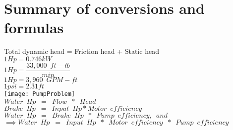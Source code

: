 \section{Summary of conversions and formulas}

Total dynamic head = Friction head + Static head\\
\vspace{0.3cm}
$1Hp=0.746kW$\\
\vspace{0.3cm}
$1Hp=\dfrac{33,000 \enspace ft-lb}{min}$\\
\vspace{0.3cm}
$1Hp=3,960 \enspace GPM-ft$\\
\vspace{0.3cm}
$1psi=2.31ft$\\
\vspace{0.3cm}
\texttt{[image: PumpProblem]}\\
\vspace{0.3cm}
$Water \enspace Hp \enspace = \enspace Flow \enspace *  \enspace Head$\\
\vspace{0.3cm}
$Brake  \enspace Hp \enspace = \enspace Input \enspace Hp*Motor \enspace efficiency$\\
\vspace{0.3cm}
$Water  \enspace Hp \enspace = \enspace Brake \enspace Hp \enspace * \enspace Pump  \enspace efficiency,  \enspace and$\\
\vspace{0.3cm}
$\implies Water  \enspace  Hp \enspace = \enspace Input  \enspace  Hp \enspace * \enspace Motor  \enspace efficiency \enspace * \enspace Pump  \enspace efficiency$\\

\newpage
\thispagestyle{empty}

\newpage

\thispagestyle{empty}

\newpage



